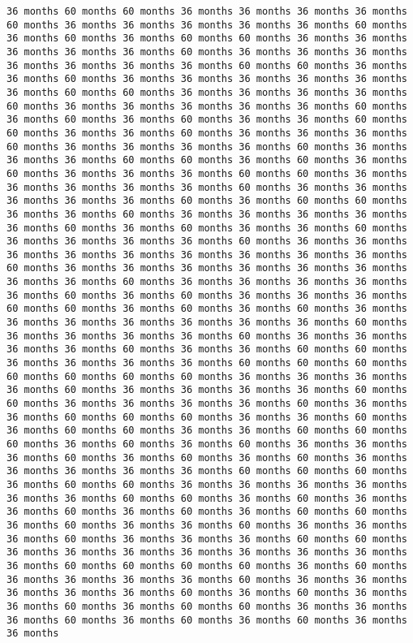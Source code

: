 \documentclass[11pt]{article}
\begin{document}
\begin{Verbatim}[commandchars=\\\{\}, frame=single, framerule=2mm, rulecolor=\color{outerrorbackground}]
36 months 60 months 60 months 36 months 36 months 36 months 36 months 60 months 36 months 36 months 36 months 36 months 36 months 60 months 36 months 60 months 36 months 60 months 60 months 36 months 36 months 36 months 36 months 36 months 60 months 36 months 36 months 36 months 36 months 36 months 36 months 36 months 60 months 60 months 36 months 36 months 60 months 36 months 36 months 36 months 36 months 36 months 36 months 60 months 60 months 36 months 36 months 36 months 36 months 60 months 36 months 36 months 36 months 36 months 36 months 60 months 36 months 60 months 36 months 60 months 36 months 36 months 60 months 60 months 36 months 36 months 60 months 36 months 36 months 36 months 60 months 36 months 36 months 36 months 36 months 60 months 36 months 36 months 36 months 60 months 60 months 36 months 60 months 36 months 60 months 36 months 36 months 36 months 60 months 60 months 36 months 36 months 36 months 36 months 36 months 60 months 36 months 36 months 36 months 36 months 36 months 60 months 36 months 60 months 60 months 36 months 36 months 60 months 36 months 36 months 36 months 36 months 36 months 60 months 36 months 60 months 36 months 36 months 60 months 36 months 36 months 36 months 36 months 60 months 36 months 36 months 36 months 36 months 36 months 36 months 36 months 36 months 36 months 60 months 36 months 36 months 36 months 36 months 36 months 36 months 36 months 36 months 60 months 36 months 36 months 36 months 36 months 36 months 60 months 36 months 60 months 36 months 36 months 36 months 60 months 60 months 36 months 60 months 36 months 60 months 36 months 36 months 36 months 36 months 36 months 36 months 36 months 60 months 36 months 36 months 36 months 36 months 60 months 36 months 36 months 36 months 36 months 60 months 36 months 36 months 60 months 60 months 36 months 36 months 36 months 36 months 60 months 60 months 60 months 60 months 60 months 60 months 60 months 36 months 36 months 36 months 36 months 60 months 36 months 36 months 36 months 36 months 60 months 60 months 36 months 36 months 36 months 36 months 60 months 36 months 36 months 60 months 60 months 60 months 36 months 36 months 60 months 36 months 60 months 60 months 36 months 36 months 60 months 60 months 60 months 36 months 60 months 36 months 60 months 36 months 36 months 36 months 60 months 36 months 60 months 36 months 60 months 36 months 36 months 36 months 36 months 36 months 60 months 60 months 60 months 36 months 60 months 60 months 36 months 36 months 36 months 36 months 36 months 36 months 60 months 60 months 36 months 60 months 36 months 36 months 60 months 36 months 60 months 36 months 60 months 60 months 36 months 60 months 36 months 36 months 60 months 36 months 36 months 36 months 60 months 36 months 36 months 36 months 60 months 60 months 36 months 36 months 36 months 36 months 36 months 36 months 36 months 36 months 60 months 60 months 60 months 60 months 36 months 60 months 36 months 36 months 36 months 36 months 60 months 36 months 36 months 36 months 36 months 36 months 60 months 36 months 60 months 36 months 36 months 60 months 36 months 60 months 60 months 36 months 36 months 36 months 60 months 36 months 60 months 36 months 60 months 36 months 36 months 
\end{Verbatim}
\end{document}
